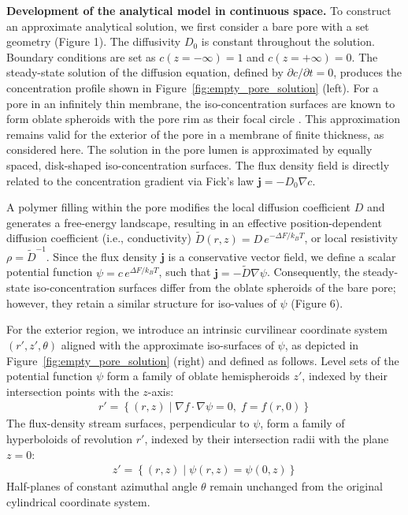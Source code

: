 \documentclass[10pt, a4paper, twocolumn]{article}
\begin{document}
\textbf{Development of the analytical model in continuous space.}
To construct an approximate analytical solution, we first consider a bare pore with a set geometry (Figure 1).
The diffusivity $D_0$ is constant throughout the solution.
Boundary conditions are set as $c(z=-\infty) = 1$ and $c(z=+\infty) = 0$.
The steady-state solution of the diffusion equation, defined by $\partial c/\partial t = 0$, produces the concentration profile shown in Figure~\ref{fig:empty_pore_solution} (left).
For a pore in an infinitely thin membrane, the iso-concentration surfaces are known to form oblate spheroids with the pore rim as their focal circle \cite{Cooke1966}.
This approximation remains valid for the exterior of the pore in a membrane of finite thickness, as considered here.
The solution in the pore lumen is approximated by equally spaced, disk-shaped iso-concentration surfaces. 
The flux density field is directly related to the concentration gradient via Fick's law \mbox{$\bm{j} = -D_0 \nabla c$}.

A polymer filling within the pore modifies the local diffusion coefficient $D$ and generates a free-energy landscape, resulting in an effective position-dependent diffusion coefficient (i.e., conductivity) $\tilde{D}(r,z) = D\,e^{-\Delta F/k_B T}$, or local resistivity $\rho = \tilde{D}^{-1}$.
Since the flux density $\bm{j}$ is a conservative vector field, we define a scalar potential function $\psi = c\,e^{\Delta F/k_B T}$, such that $\bm{j} = -\tilde{D}\nabla\psi$.
Consequently, the steady-state iso-concentration surfaces differ from the oblate spheroids of the bare pore; however, they retain a similar structure for iso-values of $\psi$ (Figure 6).

For the exterior region, we introduce an intrinsic curvilinear coordinate system $(r', z', \theta)$ aligned with the approximate iso-surfaces of $\psi$, as depicted in Figure~\ref{fig:empty_pore_solution} (right) and defined as follows.
Level sets of the potential function $\psi$ form a family of oblate hemispheroids $z'$, indexed by their intersection points with the $z$-axis:
\begin{gather}
    r' = \left\{(r,z) \mid \nabla f \cdot \nabla \psi = 0,\; f=f(r,0)\right\}
\end{gather}
The flux-density stream surfaces, perpendicular to $\psi$, form a family of hyperboloids of revolution $r'$, indexed by their intersection radii with the plane $z=0$:
\begin{gather}
    z' = \left\{(r,z) \mid \psi(r,z)=\psi(0,z)\right\}
\end{gather}
Half-planes of constant azimuthal angle $\theta$ remain unchanged from the original cylindrical coordinate system.
\end{document}
